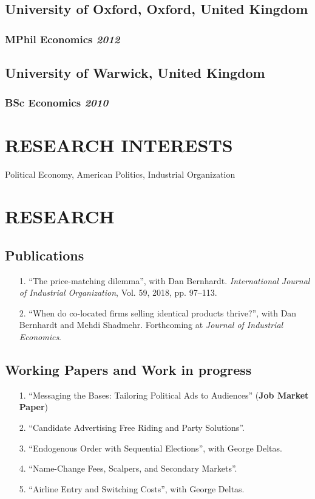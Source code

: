 \documentclass{article}
\begin{document}
\subsection{University of Oxford, Oxford, United Kingdom}
\subsubsection{MPhil Economics \hfill \emph{2012}}

\subsection{University of Warwick, United Kingdom}
\subsubsection{BSc Economics \hfill \emph{2010}}


\section{RESEARCH INTERESTS}
\noindent Political Economy, American Politics, Industrial Organization

\section{RESEARCH}
\subsection{Publications}
\begin{itemize}
    \item[1.] ``The price-matching dilemma'', with Dan Bernhardt. \emph{International Journal of Industrial Organization}, Vol. 59, 2018, pp. 97--113.
    \item[2.] ``When do co-located firms selling identical products thrive?'', with Dan Bernhardt and Mehdi Shadmehr. Forthcoming at \emph{Journal of Industrial Economics}.
\end{itemize}


\subsection{Working Papers and Work in progress}
\begin{itemize}
    \item[1.] ``Messaging the Bases: Tailoring Political Ads to Audiences'' ({\bf Job Market Paper})
    \item[2.] ``Candidate Advertising Free Riding and Party Solutions''.
    \item[3.] ``Endogenous Order with Sequential Elections'', with George Deltas.
    \item[4.] ``Name-Change Fees, Scalpers, and Secondary Markets''.
    \item[5.] ``Airline Entry and Switching Costs'', with George Deltas.
    \end{itemize}
\end{document}
